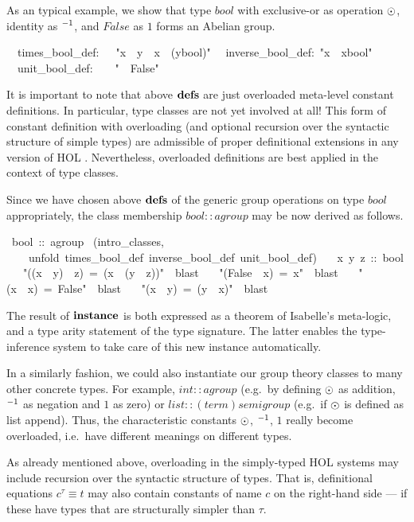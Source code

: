 \begin{isabelle}
\begin{isamarkuptext}
 As an typical example, we show that type $bool$ with exclusive-or as
 operation $\odot$, identity as $\emph{${}^{-1}$}$, and $False$ as $1$
 forms an Abelian group.%
\end{isamarkuptext}%
\isanewline
~~times\_bool\_def:~~~{"}x~{\isasymOtimes}~y~{\isasymequiv}~x~{\isasymnoteq}~(y{\isasymColon}bool){"}\isanewline
~~inverse\_bool\_def:~{"}x{\isasyminv}~{\isasymequiv}~x{\isasymColon}bool{"}\isanewline
~~unit\_bool\_def:~~~~{"}{\isasymunit}~{\isasymequiv}~False{"}%
\begin{isamarkuptext}%
\medskip It is important to note that above ${\mathord{\mathbf{defs}}}$ are just
 overloaded meta-level constant definitions.  In particular, type
 classes are not yet involved at all!  This form of constant
 definition with overloading (and optional recursion over the
 syntactic structure of simple types) are admissible of proper
 definitional extensions in any version of HOL
 \cite{Wenzel:1997:TPHOL}.  Nevertheless, overloaded definitions are
 best applied in the context of type classes.

 \medskip Since we have chosen above ${\mathord{\mathbf{defs}}}$ of the generic group
 operations on type $bool$ appropriately, the class membership $bool
 :: agroup$ may be now derived as follows.%
\end{isamarkuptext}%
~bool~::~agroup\isanewline
{}~(intro\_classes,\isanewline
~~~~unfold~times\_bool\_def~inverse\_bool\_def~unit\_bool\_def)\isanewline
~~~x~y~z~::~bool\isanewline
~~~{"}((x~{\isasymnoteq}~y)~{\isasymnoteq}~z)~=~(x~{\isasymnoteq}~(y~{\isasymnoteq}~z)){"}~~blast\isanewline
~~~{"}(False~{\isasymnoteq}~x)~=~x{"}~~blast\isanewline
~~~{"}(x~{\isasymnoteq}~x)~=~False{"}~~blast\isanewline
~~~{"}(x~{\isasymnoteq}~y)~=~(y~{\isasymnoteq}~x){"}~~blast\isanewline
{}%
\begin{isamarkuptext}%
The result of $\emph{\bf instance}$ is both expressed as a theorem
 of Isabelle's meta-logic, and a type arity statement of the type
 signature.  The latter enables the type-inference system to take care
 of this new instance automatically.

 \medskip In a similarly fashion, we could also instantiate our group
 theory classes to many other concrete types.  For example, $int ::
 agroup$ (e.g.\ by defining $\odot$ as addition, $\emph{${}^{-1}$}$ as
 negation and $1$ as zero) or $list :: (term)semigroup$ (e.g.\ if
 $\odot$ is defined as list append).  Thus, the characteristic
 constants $\odot$, $\emph{${}^{-1}$}$, $1$ really become overloaded, i.e.\
 have different meanings on different types.%
\end{isamarkuptext}%
%
%
\begin{isamarkuptext}%
As already mentioned above, overloading in the simply-typed HOL
 systems may include recursion over the syntactic structure of types.
 That is, definitional equations $c^\tau \equiv t$ may also contain
 constants of name $c$ on the right-hand side --- if these have types
 that are structurally simpler than $\tau$.


\end{isamarkuptext}
\end{isabelle}
